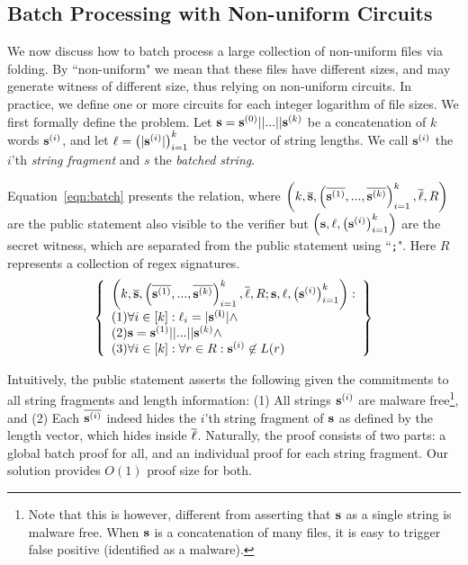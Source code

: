 \subsection{Batch Processing with Non-uniform Circuits}
We now discuss how to batch process a large collection of non-uniform
files via folding. By ``non-uniform" we mean that these files have
different sizes, and may generate witness of different size, thus
relying on non-uniform circuits. In practice, we define
one or more circuits for each integer logarithm of file sizes.
We first formally define the problem.
Let ${{\mathbf {s}}} = {{\mathbf {s}}}^{(0)} || ... || {{\mathbf {s}}}^{(k)}$
be a concatenation of $k$ words ${{\mathbf {s}}}^{(i)}$, and let 
${{\mathbf {\ell}}} = \left(|{{\mathbf {s}}}^{(i)}|\right)_{i=1}^k$ be the vector
of string lengths.
We call ${{\mathbf {s}}}^{(i)}$
the $i$'th {\em string fragment} and $s$ the {\em batched string}.

Equation\ \ref{eqn:batch} presents the relation,
where
$\left(k, \overline{{{\mathbf {s}}}}, \left(\overline{{{\mathbf {s}}}^{(1)}}, ..., \overline{{{\mathbf {s}}}^{(k)}}\right)_{i=1}^k, \overline{{{\mathbf {\ell}}}}, R\right)$
are the public statement also visible to the verifier but 
$\left({{\mathbf {s}}}, {{\mathbf {\ell}}}, \left({{\mathbf {s}}}^{(i)}\right)_{i=1}^k\right)$
are the secret witness, which are separated from the public
statement using ``\texttt{;}". 
Here $R$ represents a collection of regex signatures.
\begin{equation}
\left\{
\begin{array}{l}
	\left(k, \overline{{{\mathbf {s}}}}, 
		\left(\overline{{{\mathbf {s}}}^{(1)}}, ..., \overline{{{\mathbf {s}}}^{(k)}}\right)_{i=1}^k,
		\overline{{{\mathbf {\ell}}}}, R; {{\mathbf {s}}}, {{\mathbf {\ell}}},
		\left({{\mathbf {s}}}^{(i)}\right)_{i=1}^k
	\right): \\
	(1) \forall i\in [k]: {{\mathbf {\ell}}}_i = |{{\mathbf {s^{(i)}}}}| \wedge \\
	(2) {{\mathbf {s}}} = {{\mathbf {s}}}^{(1)} || ... || {{\mathbf {s}}}^{(k)} \wedge \\
	(3) \forall i\in [k]: \forall r\in R: {{\mathbf {s}}}^{(i)} \not\in L(r)
\end{array}
\right\}
\label{eqn:batch}
\end{equation}

Intuitively, the public statement asserts the following
given the commitments to all string fragments and length information:
(1) All strings ${{\mathbf {s}}}^{(i)}$ 
are malware free\footnote{Note that this is however, different from
asserting that ${{\mathbf {s}}}$ as a single string is malware free.
When ${{\mathbf {s}}}$ is a concatenation of many files, it is easy
to trigger false positive (identified as a malware).},
and (2) Each $\overline{{{\mathbf {s}}}^{(i)}}$ indeed hides the $i$'th
string fragment of ${{\mathbf {s}}}$ as defined by the length vector,
which hides inside $\overline{{{\mathbf {\ell}}}}$.
Naturally, the proof consists of two parts: a global batch proof
for all, and an individual proof for each string fragment.
Our solution provides $O(1)$ proof size for both.

